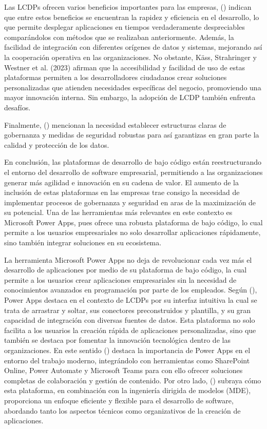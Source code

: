 \documentclass[letter,oneside,12pt,spanish]{report}
\begin{document}
\noindent Las LCDPs ofrecen varios beneficios importantes para las empresas, (\cite{sharma2023appsmith}) indican que entre estos beneficios se encuentran la rapidez y eficiencia en el desarrollo, lo que permite desplegar aplicaciones en tiempos verdaderamente despreciables comparándolos con métodos que se realizaban anteriormente. Además, la facilidad de integración con diferentes orígenes de datos y sistemas, mejorando así la cooperación operativa en las organizaciones. No obstante, Käss, Strahringer y Westner et al. (2023) afirman que la accesibilidad y facilidad de uso de estas plataformas permiten a los desarrolladores ciudadanos crear soluciones personalizadas que atienden necesidades específicas del negocio, promoviendo una mayor innovación interna. Sin embargo, la adopción de LCDP también enfrenta desafíos. 

\noindent Finalmente, (\cite{alsaadi2021lcdp}) mencionan la necesidad establecer estructuras claras de gobernanza y medidas de seguridad robustas para así garantizas en gran parte la calidad y protección de los datos.

\noindent En conclusión, las plataformas de desarrollo de bajo código están reestructurando el entorno del desarrollo de software empresarial, permitiendo a las organizaciones generar más agilidad e innovación en su cadena de valor. El aumento de la inclusión de estas plataformas en las empresas trae consigo la necesidad de implementar procesos de gobernanza y seguridad en aras de la maximización de su potencial. Una de las herramientas más relevantes en este contexto es Microsoft Power Apps, pues ofrece una robusta plataforma de bajo código, lo cual permite a los usuarios empresariales no solo desarrollar aplicaciones rápidamente, sino también integrar soluciones en su ecosistema.

\noindent La herramienta Microsoft Power Apps no deja de revolucionar cada vez más el desarrollo de aplicaciones por medio de su plataforma de bajo código, la cual permite a los usuarios crear aplicaciones empresariales sin la necesidad de conocimientos avanzados en programación por parte de los empleados. Según (\cite{pandit2024lcdp}), Power Apps destaca en el contexto de LCDPs por su interfaz intuitiva la cual se trata de arrastrar y soltar, sus conectores preconstruidos y plantilla, y su gran capacidad de integración con diversas fuentes de datos. Esta plataforma no solo facilita a los usuarios la creación rápida de aplicaciones personalizadas, sino que también se destaca por fomentar la innovación tecnológica dentro de las organizaciones. En este sentido (\cite{narayn2023modernworkplace}) destaca la importancia de Power Apps en el entorno del trabajo moderno, integrándolo con herramientas como SharePoint Online, Power Automate y Microsoft Teams para con ello ofrecer soluciones completas de colaboración y gestión de contenido. Por otro lado, (\cite{diRuscio2022lcdp}) subraya cómo esta plataforma, en combinación con la ingeniería dirigida de modelos (MDE), proporciona un enfoque eficiente y flexible para el desarrollo de software, abordando tanto los aspectos técnicos como organizativos de la creación de aplicaciones.
\end{document}
